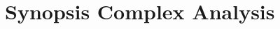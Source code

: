 \documentclass[oneside]{book}
\theoremstyle{definition}
\begin{document}
	\tableofcontents

    \chapter{Synopsis Complex Analysis}
    \newpage
   	
\end{document}
